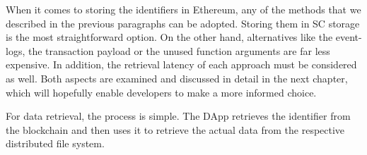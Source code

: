 When it comes to storing the identifiers in Ethereum, any of the methods that we described in the previous paragraphs can be adopted. Storing them in SC storage is the most straightforward option. On the other hand, alternatives like the event-logs, the transaction payload or the unused function arguments are far less expensive. In addition, the retrieval latency of each approach must be considered as well. Both aspects are examined and discussed in detail in the next chapter, which will hopefully enable developers to make a more informed choice.

For data retrieval, the process is simple. The DApp retrieves the identifier from the blockchain and then uses it to retrieve the actual data from the respective distributed file system.
